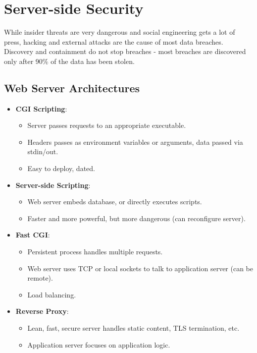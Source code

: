 \documentclass[11pt]{article}
\begin{document}
\section{Server-side Security}
While insider threats are very dangerous and social engineering gets a lot of press, hacking and external attacks are the cause of most data breaches.
Discovery and containment do not stop breaches - most breaches are discovered only after 90\% of the data has been stolen.

\subsection{Web Server Architectures}
\begin{itemize}
  \item \textbf{CGI Scripting}:
    \begin{itemize}
      \item Server passes requests to an appropriate executable.
      \item Headers passes as environment variables or arguments, data passed via stdin/out.
      \item Easy to deploy, dated.
    \end{itemize}
  \item \textbf{Server-side Scripting}:
    \begin{itemize}
      \item Web server embeds database, or directly executes scripts.
      \item Faster and more powerful, but more dangerous (can reconfigure server).
    \end{itemize}
  \item \textbf{Fast CGI}:
    \begin{itemize}
      \item Persistent process handles multiple requests.
      \item Web server uses TCP or local sockets to talk to application server (can be remote).
      \item Load balancing.
    \end{itemize}
  \item \textbf{Reverse Proxy}:
    \begin{itemize}
      \item Lean, fast, secure server handles static content, TLS termination, etc.
      \item Application server focuses on application logic.
    \end{itemize}
\end{itemize}
\end{document}
